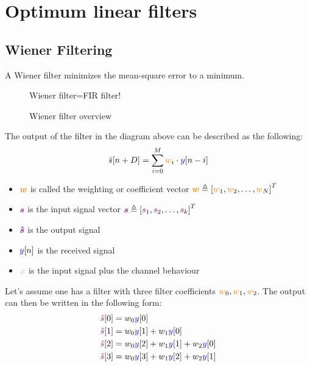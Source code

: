 \section{Optimum linear filters}
\subsection{Wiener Filtering}
A Wiener filter minimizes the mean-square error to a minimum.
\begin{figure}[ht]
  \centering
  \caption{Wiener filter=FIR filter!}
  \label{fig:wiener_3}
\end{figure}
\begin{figure}[ht]
  \centering
  \caption{Wiener filter overview}
  \label{fig:wiener_2}
\end{figure}
The output of the filter in the diagram above can be described as the following:
$$
    \hat{s}[n+D]=\sum_{i=0}^{M} \textcolor{orange}{w}_{i} \cdot \textcolor{blue}{y}[n-i]
$$
\begin{itemize}
    \item $\textcolor{orange}{\boldsymbol{w}}$ is called the weighting or coefficient vector $\boldsymbol{\textcolor{orange}{w}} \triangleq\left[\textcolor{orange}{w}_1, \textcolor{orange}{w}_2, \ldots, \textcolor{orange}{w}_N\right]^T$
    \item $\boldsymbol{\textcolor{violet}{s}}$ is the input signal vector $\boldsymbol{\textcolor{violet}{s}} \triangleq\left[\textcolor{violet}{s}_1, \textcolor{violet}{s}_2, \ldots, \textcolor{violet}{s}_k\right]^T$
    \item $\boldsymbol{\textcolor{violet}{\hat{s}}}$ is the output signal
    \item $\textcolor{blue}{y}[n]$ is the received signal
    \item $\boldsymbol{\textcolor{pink}{x}}$ is the input signal plus the channel behaviour
\end{itemize}
Let's assume one has a filter with three filter coefficients $\textcolor{orange}{w}_0,\textcolor{orange}{w}_1,\textcolor{orange}{w}_2$. The output can then be written in the following form:
$$
\begin{aligned}
& \textcolor{violet}{\hat{s}}[0]=w_0 \textcolor{blue}{y}[0] \\
& \textcolor{violet}{\hat{s}}[1]=w_0 \textcolor{blue}{y}[1]+w_1 \textcolor{blue}{y}[0] \\
& \textcolor{violet}{\hat{s}}[2]=w_0 \textcolor{blue}{y}[2]+w_1 \textcolor{blue}{y}[1]+w_2 \textcolor{blue}{y}[0] \\
& \textcolor{violet}{\hat{s}}[3]=w_0 \textcolor{blue}{y}[3]+w_1 \textcolor{blue}{y}[2]+w_2 \textcolor{blue}{y}[1]
\end{aligned}
$$
